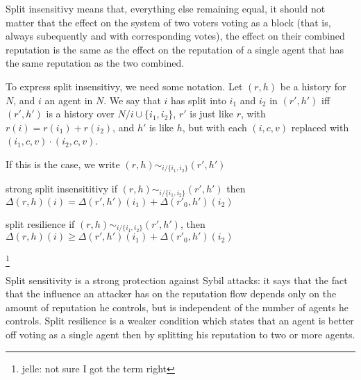 \documentclass{article}
\begin{document}
Split insensitivy means that, everything else remaining equal, it should not matter that the effect on the system of two voters voting as a block (that is, always subequently and with corresponding votes), the effect on their combined reputation is the same as the effect on the reputation of a single agent that has the same reputation as the two combined.

To express split insensitivy, we need some notation. Let $(r, h)$ be a history for $N$, and $i$ an agent in $N$. We say that $i$ has split into $i_1$ and $i_2$ in $(r', h')$  iff $(r', h')$ is a history over $N / {i} \cup \{i_1, i_2\}$, $r'$ is just like $r$, with $r(i) = r(i_1) + r(i_2)$, and $h'$ is like $h$, but with each $(i, c, v)$ replaced with $(i_1, c, v) \cdot (i_2, c, v)$. 

If this is the case, we write $(r, h) \sim_{i/\{i_1, i_2\}} (r', h')$

\begin{condition}{strong split insensititivy} 
if $(r, h) \sim_{i/\{i_1, i_2\}} (r', h')$ then $\Delta(r, h)(i) = \Delta(r', h')(i_1) + \Delta(r'_0, h')(i_2)$
\end{condition}


\begin{condition}{split resilience}
if $(r, h) \sim_{i/\{i_1, i_2\}} (r', h')$, then $\Delta(r, h)(i) \geq \Delta(r', h')(i_1) + \Delta(r'_0, h')(i_2)$
\end{condition}\footnote{jelle: not sure I got the term right}



%

Split sensitivity is a strong protection against Sybil attacks: it says that the fact that the influence an attacker has on the reputation flow depends only on the amount of reputation he controls, but is independent of the number of agents he controls. Split resilience is a weaker condition which states that an agent is better off voting as a single agent then by splitting his reputation to two or more agents. 

\end{document}
